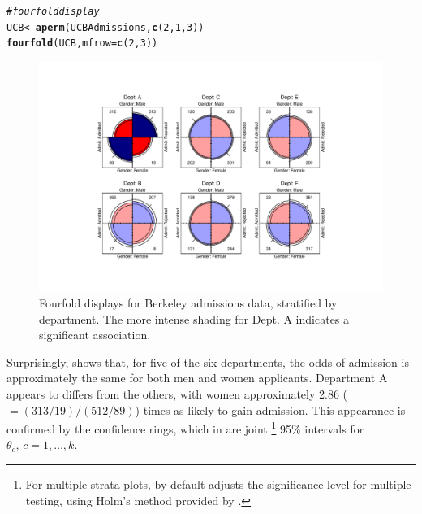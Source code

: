 \documentclass[11pt]{book}\usepackage[]{graphicx}\usepackage[]{color}
\makeatletter
\newcommand{\hlnum}[1]{\textcolor[rgb]{0.686,0.059,0.569}{#1}}%
\newcommand{\hlcom}[1]{\textcolor[rgb]{0.678,0.584,0.686}{\textit{#1}}}%
\newcommand{\hlstd}[1]{\textcolor[rgb]{0.345,0.345,0.345}{#1}}%
\newcommand{\hlkwb}[1]{\textcolor[rgb]{0.69,0.353,0.396}{#1}}%
\newcommand{\hlkwc}[1]{\textcolor[rgb]{0.333,0.667,0.333}{#1}}%
\newcommand{\hlkwd}[1]{\textcolor[rgb]{0.737,0.353,0.396}{\textbf{#1}}}%
\newenvironment{kframe}{%
 \def\at@end@of@kframe{}%
 \ifinner\ifhmode%
  \def\at@end@of@kframe{\end{minipage}}%
  \begin{minipage}{\columnwidth}%
 \fi\fi%
 \def\FrameCommand##1{\hskip\@totalleftmargin \hskip-\fboxsep
 \colorbox{shadecolor}{##1}\hskip-\fboxsep
     \hskip-\linewidth \hskip-\@totalleftmargin \hskip\columnwidth}%
 \MakeFramed {\advance\hsize-\width
   \@totalleftmargin\z@ \linewidth\hsize
   \@setminipage}}%
 {\par\unskip\endMakeFramed%
 \at@end@of@kframe}
\newenvironment{knitrout}{}{} %
\renewenvironment{knitrout}{\small\renewcommand{\baselinestretch}{.85}}{} %
\makeatother
\begin{document}
\begin{knitrout}
\color{fgcolor}\begin{kframe}
\begin{alltt}
\hlcom{# fourfold display}
\hlstd{UCB} \hlkwb{<-} \hlkwd{aperm}\hlstd{(UCBAdmissions,} \hlkwd{c}\hlstd{(}\hlnum{2}\hlstd{,} \hlnum{1}\hlstd{,} \hlnum{3}\hlstd{))}
\hlkwd{fourfold}\hlstd{(UCB,}\hlkwc{mfrow}\hlstd{=}\hlkwd{c}\hlstd{(}\hlnum{2}\hlstd{,}\hlnum{3}\hlstd{))}
\end{alltt}
\end{kframe}\begin{figure}[htbp]


\centerline{\includegraphics[width=.95\textwidth,trim=80 50 80 50]{ch04/fig/berk-fourfold4} }

\caption[Fourfold displays for Berkeley admissions data, stratified by department]{Fourfold displays for Berkeley admissions data, stratified by department. The more intense shading for Dept. A indicates a significant association.\label{fig:berk-fourfold4}}
\end{figure}


\end{knitrout}


Surprisingly,  shows that, for five of the
six departments, the odds of admission is approximately the same for
both men and women applicants.  Department A appears to differs from
the others, with women approximately 2.86 (\(=  ( 313/19 )  /
(512/89)\)) times as likely to gain admission.  This appearance is
confirmed by the confidence rings, which in 
are joint%
\footnote{
For multiple-strata plots,  by default adjusts the
significance level for multiple testing, using Holm's 
\citeyearpar{Holm:1979} method
provided by .
}
95\% intervals for \(\theta_c ,  \,  c = 1, \dots ,
k\).
\end{document}
